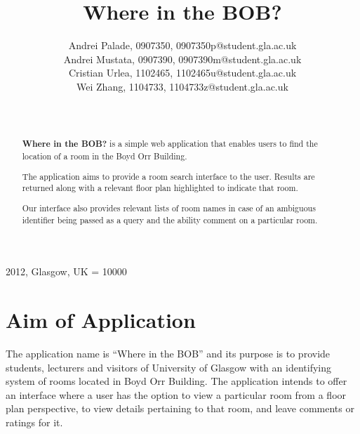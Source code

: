 \documentclass{sig-alt-release2}
\begin{document}
\newcommand{\todo}[1]{\textcolor{red}{#1}}
\def\newblock{\hskip .11em plus .33em minus .07em}

 {2012, Glasgow, UK} 
\widowpenalty = 10000

\title{{Where in the BOB?}}

\author{
Andrei Palade, 0907350, 0907350p@student.gla.ac.uk\\
Andrei Mustata, 0907390, 0907390m@student.gla.ac.uk\\
Cristian Urlea, 1102465, 1102465u@student.gla.ac.uk \\
Wei Zhang, 1104733, 1104733z@student.gla.ac.uk\\
\\
          \\
}

\maketitle

\begin{abstract}

\textbf{Where in the BOB?} is a simple web application that enables users to
find the location of a room in the Boyd Orr Building. 

The application aims to provide a room search interface to the user.
Results are returned along with a relevant floor plan highlighted to
indicate that room.

Our interface also provides relevant lists of room names in case of an ambiguous 
identifier being passed as a query and the ability comment on a particular room. 

\end{abstract}

\section{Aim of Application}

The application name is ``Where in the BOB'' and its purpose is to provide
students, lecturers and visitors of University of Glasgow with an identifying
system of rooms located in Boyd Orr Building. The application intends to
offer an interface where a user has the option to view a particular 
room from a floor plan perspective, to view details pertaining to that room, and 
leave comments or ratings for it.
\end{document}
